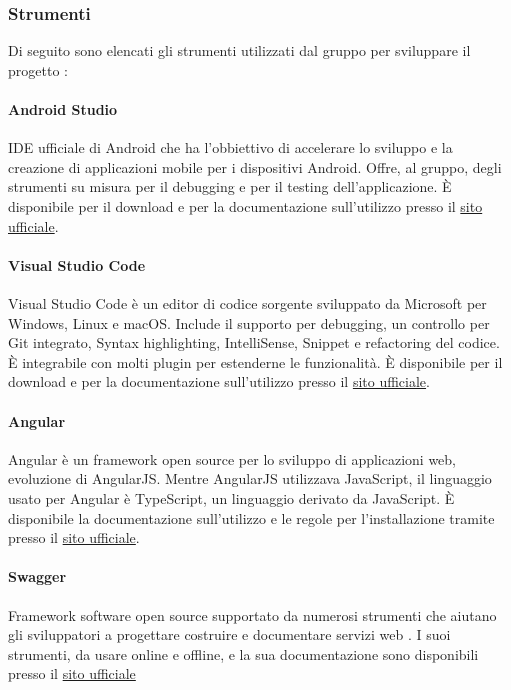 \subsubsection{Strumenti}
Di seguito sono elencati gli strumenti utilizzati dal gruppo per sviluppare il progetto \glo{\NomeProgetto{}}:

\paragraph{Android Studio}
IDE ufficiale di Android che ha l'obbiettivo di accelerare lo sviluppo e la creazione di applicazioni mobile per i dispositivi Android.
Offre, al gruppo, degli strumenti su misura per il debugging e per il testing dell'applicazione. È disponibile per il download e per la documentazione sull'utilizzo presso il \href{https://developer.android.com/studio}{sito ufficiale}.

\paragraph{Visual Studio Code}
Visual Studio Code è un editor di codice sorgente sviluppato da Microsoft per Windows, Linux e macOS. Include il supporto per debugging, un controllo per Git integrato, Syntax highlighting, IntelliSense, Snippet e refactoring del codice.
È integrabile con molti plugin per estenderne le funzionalità. È disponibile per il download e per la documentazione sull'utilizzo presso il \href{https://code.visualstudio.com/}{sito ufficiale}.

\paragraph{Angular}
Angular è un framework open source per lo sviluppo di applicazioni web, evoluzione di AngularJS. Mentre AngularJS utilizzava JavaScript, il linguaggio usato per Angular è TypeScript, un linguaggio derivato da JavaScript.
È disponibile la documentazione sull'utilizzo e le regole per l'installazione tramite  presso il \href{https://angular.io/}{sito ufficiale}.

\paragraph{Swagger}
Framework software open source supportato da numerosi strumenti che aiutano gli sviluppatori a progettare costruire e documentare servizi web .
I suoi strumenti, da usare online e offline, e la sua documentazione sono disponibili presso il \href{https://swagger.io/}{sito ufficiale}

